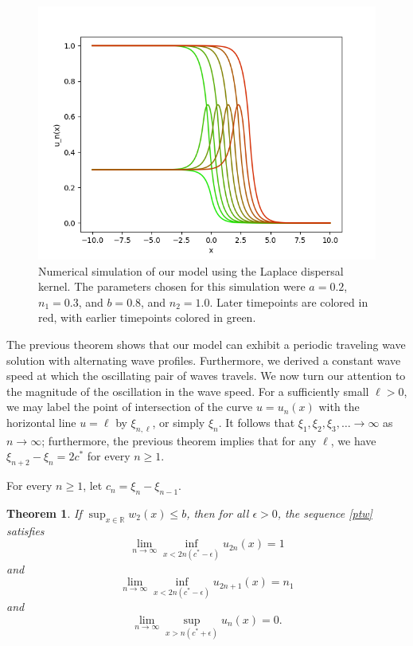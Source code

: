 \documentclass[11pt]{article}
\newtheorem{thm}{Theorem}
\theoremstyle{definition}
\numberwithin{equation}{section}
\numberwithin{thm}{section}
\renewcommand{\a}{a}
\renewcommand{\b}{b}
\newcommand{\m}{n_1}
\newcommand{\mtwo}{n_2}
\begin{document}
\begin{figure}[h!] 
\centering
  \caption{Numerical simulation of our model using the Laplace dispersal kernel. The parameters chosen for this simulation were $\a=0.2$, $\m=0.3$, and $\b=0.8$, and $\mtwo=1.0$. Later timepoints are colored in red, with earlier timepoints colored in green.}
\label{fig3}
  \includegraphics[width=.8\linewidth]{figures/fig3.png}
\end{figure}

The previous theorem shows that our model can exhibit a periodic traveling wave solution with alternating wave profiles. Furthermore, we derived a constant wave speed at which the oscillating pair of waves travels. We now turn our attention to the magnitude of the oscillation in the wave speed. For a sufficiently small $\ell > 0$, we may label the point of intersection of the curve $u=u_n(x)$ with the horizontal line $u=\ell$ by $\xi_{n,\ell}$, or simply $\xi_n$. It follows that $\xi_1,\xi_2,\xi_3,\dots\to\infty$ as $n\to\infty$; furthermore, the previous theorem implies that for any $\ell$, we have $\xi_{n+2}-\xi_n=2c^*$ for every $n\geq 1$.

For every $n\geq 1$, let $c_n = \xi_n - \xi_{n-1}$.

\begin{thm}  \label{theorem2}
If $\sup_{x\in\mathbb R}w_2(x)\leq \b$, then for all $\epsilon>0$, the sequence \ref{ptw} satisfies
\begin{equation}
\lim_{n\to\infty}\inf_{x<2n(c^*-\epsilon)}u_{2n}(x)=1
\end{equation}
and
\begin{equation}
\lim_{n\to\infty}\inf_{x<2n(c^*-\epsilon)}u_{2n+1}(x)=\m
\end{equation}
and 
\begin{equation}
\lim_{n\to\infty}\sup_{x>n(c^*+\epsilon)}u_n(x)=0.
\end{equation}
\end{thm}
\end{document}
